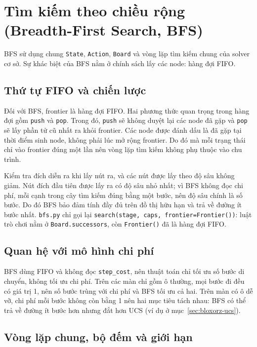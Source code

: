 \section{Tìm kiếm theo chiều rộng (Breadth-First Search, BFS)}
\label{sec:bloxorz-bfs}

BFS sử dụng chung \texttt{State}, \texttt{Action}, \texttt{Board} và vòng lặp tìm kiếm
chung của solver cơ sở. Sự khác biệt của BFS nằm ở chính sách lấy các node: hàng đợi
FIFO.

\subsection{Thứ tự FIFO và chiến lược}

Đối với BFS, frontier là hàng đợi FIFO. Hai phương thức quan trọng trong hàng đợi gồm
\texttt{push} và \texttt{pop}. Trong đó, \texttt{push} sẽ không duyệt lại các node đã
gặp và \texttt{pop} sẽ lấy phần tử cũ nhất ra khỏi frontier. Các node được đánh dấu là
đã gặp tại thời điểm sinh node, không phải lúc mở rộng frontier. Do đó mà mỗi trạng thái
chỉ vào frontier đúng một lần nên vòng lặp tìm kiếm không phụ thuộc vào chu trình.

Kiểm tra đích diễn ra khi lấy nút ra, và các nút được lấy theo độ sâu không giảm. Nút
đích đầu tiên được lấy ra có độ sâu nhỏ nhất; vì BFS không đọc chi phí, mỗi cạnh trong
cây tìm kiếm đúng bằng một bước, nên độ sâu chính là số bước. Do đó BFS bảo đảm tính đầy
đủ trên đồ thị hữu hạn và trả về đường ít bước nhất. \texttt{bfs.py} chỉ gọi lại
\texttt{search(stage, caps, frontier=Frontier())}: luật trò chơi nằm ở
\texttt{Board.successors}, còn \texttt{Frontier()} đã là hàng đợi FIFO.

\subsection{Quan hệ với mô hình chi phí}

BFS dùng FIFO và không đọc \texttt{step\_cost}, nên thuật toán chỉ tối ưu số bước di
chuyển, không tối ưu chi phí. Trên các màn chỉ gồm ô thường, mọi bước đi đều có giá trị
1, nên số bước trùng với chi phí và BFS tối ưu cả hai. Trên màn có ô dễ vỡ, chi phí mỗi
bước không còn bằng 1 nên hai mục tiêu tách nhau: BFS có thể trả về đường ít bước hơn
nhưng đắt hơn UCS (ví dụ ở mục~\ref{sec:bloxorz-ucs}).

\subsection{Vòng lặp chung, bộ đếm và giới hạn}

